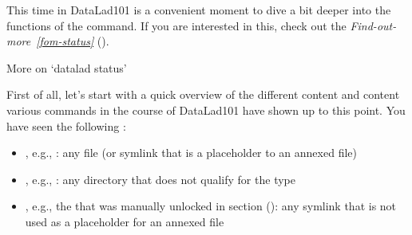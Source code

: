 \sphinxAtStartPar
This time in DataLad\sphinxhyphen{}101 is a convenient moment to dive a bit deeper
into the functions of the  command. If you are
interested in this, check out the \textit{Find-out-more}~{\findoutmoreiconinline}\textit{\ref{fom-status}} {\hyperref[\detokenize{basics/101-132-advancednesting:fom-status}]{}} ().

\ignorespaces \begin{findoutmore}[label={fom-status}, before title={\thetcbcounter\ }, float, check odd page=true]{More on ‘datalad status’}
\label{\detokenize{basics/101-132-advancednesting:fom-status}}

\sphinxAtStartPar
First of all, let’s start with a quick overview of the different content 
and content  various  commands in the course
of DataLad\sphinxhyphen{}101 have shown up to this point.
You have seen the following :
\begin{itemize}
\item {} 
\sphinxAtStartPar
{}, e.g., : any file (or symlink that is a placeholder to an annexed file)

\item {} 
\sphinxAtStartPar
{}, e.g., : any directory that does not qualify for the  type

\item {} 
\sphinxAtStartPar
{}, e.g., the  that was manually unlocked in section {\hyperref[\detokenize{basics/101-110-run2:run3}]{}} ():
any symlink that is not used as a placeholder for an annexed file


\end{itemize}
\end{findoutmore}
